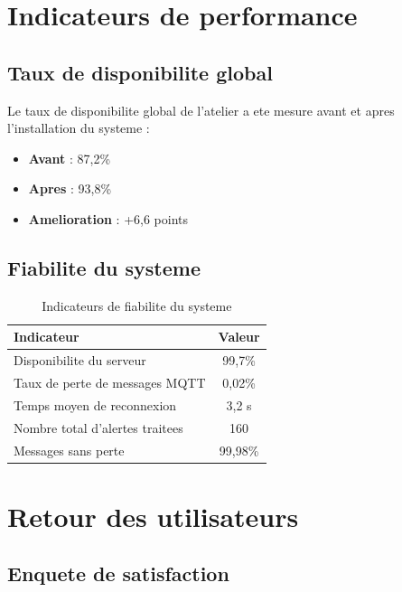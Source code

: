 \section{Indicateurs de performance}

\subsection{Taux de disponibilite global}

Le taux de disponibilite global de l'atelier a ete mesure avant et apres l'installation du systeme :

\begin{itemize}
    \item \textbf{Avant} : 87,2\%
    \item \textbf{Apres} : 93,8\%
    \item \textbf{Amelioration} : +6,6 points
\end{itemize}

\subsection{Fiabilite du systeme}

\begin{table}[htbp]
\centering
\renewcommand{\arraystretch}{1.3}
\begin{tabular}{l c}
\toprule
\textbf{Indicateur} & \textbf{Valeur} \\
\midrule
Disponibilite du serveur & 99,7\% \\
Taux de perte de messages MQTT & 0,02\% \\
Temps moyen de reconnexion & 3,2 s \\
Nombre total d'alertes traitees & 160 \\
Messages sans perte & 99,98\% \\
\bottomrule
\end{tabular}
\caption{Indicateurs de fiabilite du systeme}
\label{tab:fiabilite}
\end{table}

\section{Retour des utilisateurs}

\subsection{Enquete de satisfaction}


